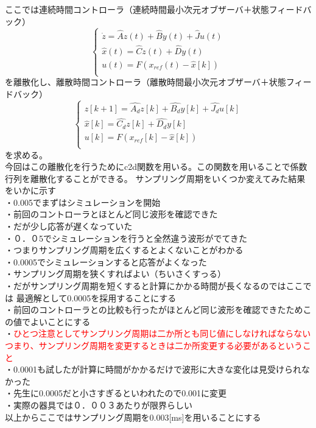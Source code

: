 \documentclass{jarticle}
\begin{document}
\begin{enumerate}
\begin{enumerate}
\begin{enumerate}
					ここでは連続時間コントローラ（連続時間最小次元オブザーバ＋状態フィードバック）
					\begin{equation}
						\left\{
						\begin{array}{l}
							\dot{z} = \widehat{A}z(t) + \widehat{B}y(t) + \widehat{J}u(t)\\
							\widehat{x} (t) = \widehat{C}z(t) + \widehat{D}y(t)\\
							u(t) = F(x_{ref}(t) - \widehat{x}[k]) \\ 
						\end{array}
						\right.
					\end{equation}
					を離散化し、離散時間コントローラ（離散時間最小次元オブザーバ＋状態フィードバック）
					\begin{equation}
						\left\{
						\begin{array}{l}
							z[k+1] = \widehat{A_{d}}z[k]+\widehat{B_{d}}y[k]+\widehat{J_{d}}u[k]\\
							\widehat{x}[k] = \widehat{C_{d}}z[k]+\widehat{D_{d}}y[k] \\
							u[k] = F(x_{ref}[k] - \widehat{x}[k])\\
						\end{array}
						\right.
					\end{equation}
					を求める。\\
					今回はこの離散化を行うためにc2d関数を用いる。この関数を用いることで係数行列を離散化することができる。
					サンプリング周期をいくつか変えてみた結果をいかに示す\\
					・0.005でまずはシミュレーションを開始\\
					・前回のコントローラとほとんど同じ波形を確認できた\\
					・だが少し応答が遅くなっていた\\
					・０．０5でシミュレーションを行うと全然違う波形がでてきた\\
					・つまりサンプリング周期を広くするとよくないことがわかる\\
					・0.0005でシミュレーションすると応答がよくなった\\
					・サンプリング周期を狭くすればよい（ちいさくすっる）\\
					・だがサンプリング周期を短くすると計算にかかる時間が長くなるのではここでは
					最適解として0.0005を採用することにする\\
					・前回のコントローラとの比較も行ったがほとんど同じ波形を確認できたためこの値でよいことにする\\
					・\textcolor{red}{ひとつ注意としてサンプリング周期は二か所とも同じ値にしなければならない
					つまり、サンプリング周期を変更するときは二か所変更する必要があるということ}\\
					・0.0001も試したが計算に時間がかかるだけで波形に大きな変化は見受けられなかった\\
					・先生に0.0005だと小さすぎるといわれたので0.001に変更\\
					・実際の器具では０．００３あたりが限界らしい\\
					以上からここではサンプリング周期を0.003[ms]を用いることにする
				

\end{enumerate}
\end{enumerate}
\end{enumerate}
\end{document}
